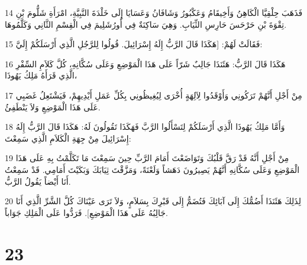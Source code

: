 \par 14 فَذَهَبَ حِلْقِيَّا الْكَاهِنُ وَأَخِيقَامُ وَعَكْبُورُ وَشَافَانُ وَعَسَايَا إِلَى خَلْدَةَ النَّبِيَّةِ، امْرَأَةِ شَلُّومَ بْنِ تِقْوَةَ بْنِ حَرْحَسَ حَارِسِ الثِّيَابِ. وَهِيَ سَاكِنَةٌ فِي أُورُشَلِيمَ فِي الْقِسْمِ الثَّانِي وَكَلَّمُوهَا.
\par 15 فَقَالَتْ لَهُمْ: [هَكَذَا قَالَ الرَّبُّ إِلَهُ إِسْرَائِيلَ. قُولُوا لِلرَّجُلِ الَّذِي أَرْسَلَكُمْ إِلَيَّ:
\par 16 هَكَذَا قَالَ الرَّبُّ: هَئَنَذَا جَالِبٌ شَرّاً عَلَى هَذَا الْمَوْضِعِ وَعَلَى سُكَّانِهِ، كُلَّ كَلاَمِ السِّفْرِ الَّذِي قَرَأَهُ مَلِكُ يَهُوذَا،
\par 17 مِنْ أَجْلِ أَنَّهُمْ تَرَكُونِي وَأَوْقَدُوا لِآلِهَةٍ أُخْرَى لِيُغِيظُونِي بِكُلِّ عَمَلِ أَيْدِيهِمْ، فَيَشْتَعِلُ غَضَبِي عَلَى هَذَا الْمَوْضِعِ وَلاَ يَنْطَفِئُ.
\par 18 وَأَمَّا مَلِكُ يَهُوذَا الَّذِي أَرْسَلَكُمْ لِتَسْأَلُوا الرَّبَّ فَهَكَذَا تَقُولُونَ لَهُ: هَكَذَا قَالَ الرَّبُّ إِلَهُ إِسْرَائِيلَ مِنْ جِهَةِ الْكَلاَمِ الَّذِي سَمِعْتَ:
\par 19 مِنْ أَجْلِ أَنَّهُ قَدْ رَقَّ قَلْبُكَ وَتَوَاضَعْتَ أَمَامَ الرَّبِّ حِينَ سَمِعْتَ مَا تَكَلَّمْتُ بِهِ عَلَى هَذَا الْمَوْضِعِ وَعَلَى سُكَّانِهِ أَنَّهُمْ يَصِيرُونَ دَهَشاً وَلَعْنَةً، وَمَزَّقْتَ ثِيَابَكَ وَبَكَيْتَ أَمَامِي. قَدْ سَمِعْتُ أَنَا أَيْضاً يَقُولُ الرَّبُّ.
\par 20 لِذَلِكَ هَئَنَذَا أَضُمُّكَ إِلَى آبَائِكَ فَتُضَمُّ إِلَى قَبْرِكَ بِسَلاَمٍ، وَلاَ تَرَى عَيْنَاكَ كُلَّ الشَّرِّ الَّذِي أَنَا جَالِبُهُ عَلَى هَذَا الْمَوْضِعِ]. فَرَدُّوا عَلَى الْمَلِكِ جَوَاباً.

\chapter{23}


